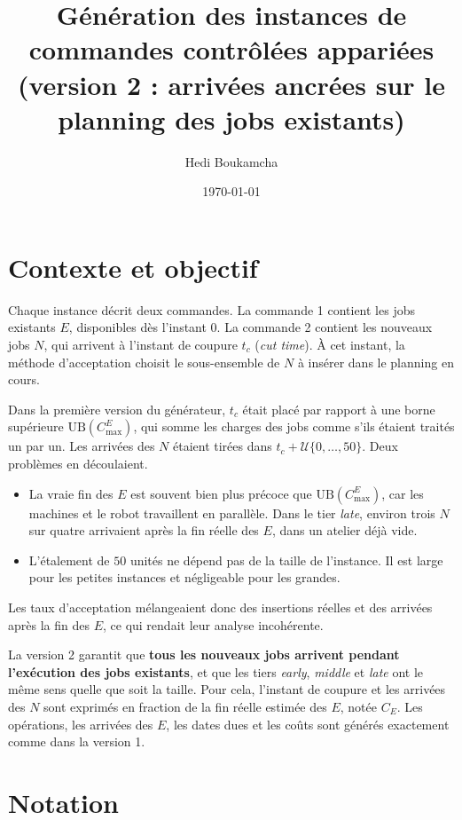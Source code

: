 \documentclass[11pt,a4paper]{article}
\title{Génération des instances de commandes contrôlées appariées\\(version 2 : arrivées ancrées sur le planning des jobs existants)}
\author{Hedi Boukamcha}
\date{\today}
\newcommand{\UB}{\mathrm{UB}}
\newcommand{\CE}{C_E}
\begin{document}
\maketitle

\section{Contexte et objectif}

Chaque instance décrit deux commandes. La commande 1 contient les jobs existants $E$, disponibles dès l'instant $0$.
La commande 2 contient les nouveaux jobs $N$, qui arrivent à l'instant de coupure $t_c$ (\emph{cut time}).
À cet instant, la méthode d'acceptation choisit le sous-ensemble de $N$ à insérer dans le planning en cours.

Dans la première version du générateur, $t_c$ était placé par rapport à une borne supérieure $\UB(C^E_{\max})$, qui somme les charges des jobs comme s'ils étaient traités un par un.
Les arrivées des $N$ étaient tirées dans $t_c + \mathcal{U}\{0,\dots,50\}$.
Deux problèmes en découlaient.
\begin{itemize}
  \item La vraie fin des $E$ est souvent bien plus précoce que $\UB(C^E_{\max})$, car les machines et le robot travaillent en parallèle. Dans le tier \emph{late}, environ trois $N$ sur quatre arrivaient après la fin réelle des $E$, dans un atelier déjà vide.
  \item L'étalement de $50$ unités ne dépend pas de la taille de l'instance. Il est large pour les petites instances et négligeable pour les grandes.
\end{itemize}
Les taux d'acceptation mélangeaient donc des insertions réelles et des arrivées après la fin des $E$, ce qui rendait leur analyse incohérente.

La version 2 garantit que \textbf{tous les nouveaux jobs arrivent pendant l'exécution des jobs existants}, et que les tiers \emph{early}, \emph{middle} et \emph{late} ont le même sens quelle que soit la taille.
Pour cela, l'instant de coupure et les arrivées des $N$ sont exprimés en fraction de la fin réelle estimée des $E$, notée $\CE$.
Les opérations, les arrivées des $E$, les dates dues et les coûts sont générés exactement comme dans la version 1.

\section{Notation}
\end{document}
